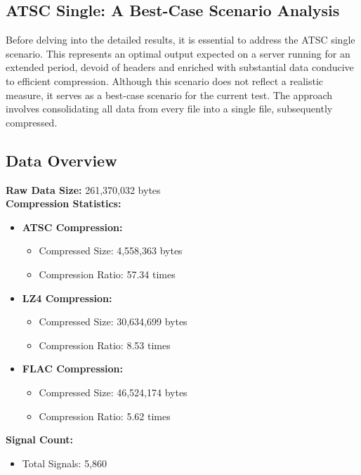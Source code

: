 \documentclass[conference]{IEEEtran}
\begin{document}
\subsection*{ATSC Single: A Best-Case Scenario Analysis}

Before delving into the detailed results, it is essential to address the ATSC single scenario. This represents an optimal output expected on a server running for an extended period, devoid of headers and enriched with substantial data conducive to efficient compression. Although this scenario does not reflect a realistic measure, it serves as a best-case scenario for the current test. The approach involves consolidating all data from every file into a single file, subsequently compressed.

\subsection*{Data Overview}

\textbf{Raw Data Size:} 261,370,032 bytes \\
\textbf{Compression Statistics:}

\begin{itemize}
    \item \textbf{ATSC Compression:}
    \begin{itemize}
        \item Compressed Size: 4,558,363 bytes
        \item Compression Ratio: 57.34 times
    \end{itemize}
    \item \textbf{LZ4 Compression:}
    \begin{itemize}
        \item Compressed Size: 30,634,699 bytes
        \item Compression Ratio: 8.53 times
    \end{itemize}
    \item \textbf{FLAC Compression:}
    \begin{itemize}
        \item Compressed Size: 46,524,174 bytes
        \item Compression Ratio: 5.62 times
    \end{itemize}
\end{itemize}

\textbf{Signal Count:}

\begin{itemize}
    \item Total Signals: 5,860
\end{itemize}
\end{document}
